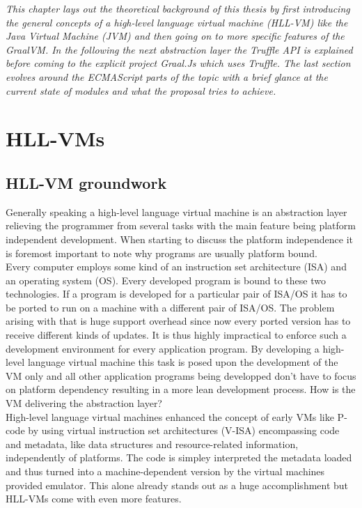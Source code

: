 \emph{This chapter lays out the theoretical background of this thesis by first introducing the general concepts of a high-level language virtual machine (HLL-VM) like the Java Virtual Machine (JVM) and then going on to more specific features of the GraalVM. In the following the next abstraction layer the Truffle API is explained before coming to the explicit project Graal.Js which uses Truffle. The last section evolves around the ECMAScript parts of the topic with a brief glance at the current state of modules and what the proposal tries to achieve.}

\section{HLL-VMs}
\subsection{HLL-VM groundwork}
Generally speaking a high-level language virtual machine is an abstraction layer relieving the programmer from several tasks with the main feature being platform independent development. When starting to discuss the platform independence it is foremost important to note why programs are usually platform bound.\\
Every computer employs some kind of an instruction set architecture (ISA) and an operating system (OS). Every developed program is bound to these two technologies. If a program is developed for a particular pair of ISA/OS it has to be ported to run on a machine with a different pair of ISA/OS. The problem arising with that is huge support overhead since now every ported version has to receive different kinds of updates. It is thus highly impractical to enforce such a development environment for every application program. By developing a high-level language virtual machine this task is posed upon the development of the VM only and all other application programs being developped don't have to focus on platform dependency resulting in a more lean development process. How is the VM delivering the abstraction layer?\\
High-level language virtual machines enhanced the concept of early VMs like P-code by using virtual instruction set architectures (V-ISA) encompassing code and metadata, like data structures and resource-related information, independently of platforms. The code is simpley interpreted the metadata loaded and thus turned into a machine-dependent version by the virtual machines provided emulator. This alone already stands out as a huge accomplishment but HLL-VMs come with even more features.\\
